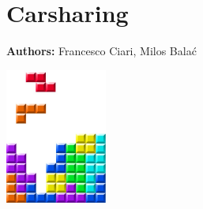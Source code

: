 \chapter{Carsharing}
\label{ch:carsharing}

\hfill \textbf{Authors:} Francesco Ciari, Milos Balać

\begin{center} \includegraphics[width=0.25\textwidth, angle=0]{frontmatter/figures/MATSimBook} \end{center}



